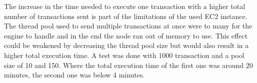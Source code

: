 \begin{minipage}{\linewidth}
   \label{fig:burrowtxs}
\end{minipage}

The increase in the time needed to execute one transaction with a higher total number of transactions sent is part of the
limitations of the used EC2 instance. The thread pool used to send multiple transactions at once were to many for the engine
to handle and in the end the node ran out of memory to use. This effect could be weakened by decreasing the thread pool size
but would also result in a higher total execution time. A test was done with 1000 transaction and a pool size of 10 and 150.
Where the total execution time of the first one was around 20 minutes, the second one was below 4 minutes.



